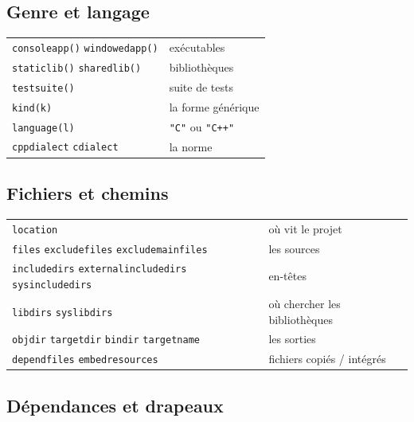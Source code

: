\subsection*{Genre et langage}

\begin{center}
\begin{tabular}{@{}ll@{}}
\toprule
\texttt{consoleapp()} \texttt{windowedapp()} & exécutables \\
\texttt{staticlib()} \texttt{sharedlib()} & bibliothèques \\
\texttt{testsuite()} & suite de tests \\
\texttt{kind(k)} & la forme générique \\
\texttt{language(l)} & \texttt{"C"} ou \texttt{"C++"} \\
\texttt{cppdialect} \texttt{cdialect} & la norme \\
\bottomrule
\end{tabular}
\end{center}

\subsection*{Fichiers et chemins}

\begin{center}
\begin{tabular}{@{}ll@{}}
\toprule
\texttt{location} & où vit le projet \\
\texttt{files} \texttt{excludefiles} \texttt{excludemainfiles} & les sources \\
\texttt{includedirs} \texttt{externalincludedirs} \texttt{sysincludedirs} & en-têtes \\
\texttt{libdirs} \texttt{syslibdirs} & où chercher les bibliothèques \\
\texttt{objdir} \texttt{targetdir} \texttt{bindir} \texttt{targetname} & les sorties \\
\texttt{dependfiles} \texttt{embedresources} & fichiers copiés / intégrés \\
\bottomrule
\end{tabular}
\end{center}

\subsection*{Dépendances et drapeaux}

